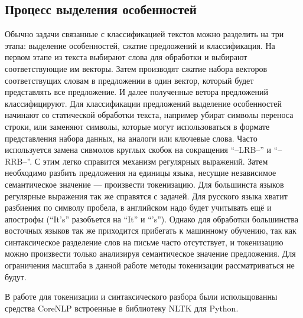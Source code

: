 \subsection{Процесс выделения особенностей}\label{subsec:overview:overview_feature_extraction}
Обычно задачи связанные с классификацией текстов можно разделить на три этапа: выделение особенностей, сжатие предложений и классификация. На первом этапе из текста выбирают слова для обработки и выбирают соответствующие им векторы. Затем производят сжатие набора векторов соответствущих словам в предложении в один вектор, который будет представлять все предложение. И далее полученные ветора предложений классифицируют.\cite{Goodfellow-et-al-2016}
Для классификации предложений выделение особенностей начинают со статической обработки текста, например убират символы переноса строки, или заменяют символы, которые могут использоваться в формате представления набора данных, на аналоги или ключевые слова. Часто используется замена сивмолов круглых скобок на сокращения ``--LRB--'' и ``--RRB--''. С этим легко справится механизм регулярных выражений. Затем необходимо разбить предложения на единицы языка, несущие независимое семантическое значение — произвести токенизацию. Для большинста языков регулярные выражения так же справятся с задачей. Для русского языка хватит разбиения по символу пробела, в английском надо будет учитывать ещё и апострофы (``It's'' разобъется на ``It'' и ``'s''). Однако для обработки большинства восточных языков так же приходится прибегать к машинному обучению, так как синтаксическое разделение слов на письме часто отсутствует, и токенизацию можно произвести только анализируя семантическое значение предложения. Для ограничения масштаба в данной работе методы токенизации рассматриваться не будут.\cite{Goodfellow-et-al-2016}

В работе для токенизации и синтаксического разбора были испольщованны средства CoreNLP встроенные в библиотеку NLTK для Python.

